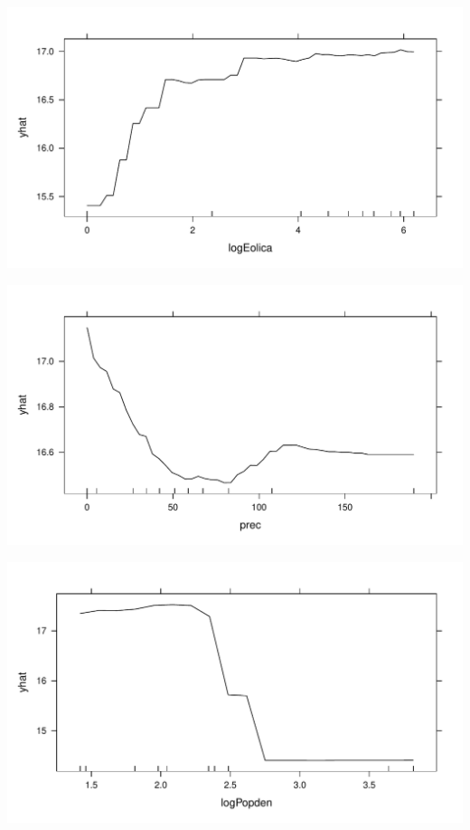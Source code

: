 \documentclass[
]{report}
\begin{document}
\includegraphics{Modelling_Energy_Intensity-V3_files/figure-pdf/unnamed-chunk-3-2.pdf}

\includegraphics{Modelling_Energy_Intensity-V3_files/figure-pdf/unnamed-chunk-3-3.pdf}

\includegraphics{Modelling_Energy_Intensity-V3_files/figure-pdf/unnamed-chunk-3-4.pdf}
\end{document}
